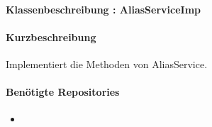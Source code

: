 \paragraph{Klassenbeschreibung : AliasServiceImp}%
\paragraph*{Kurzbeschreibung}
Implementiert die Methoden von AliasService.
\paragraph*{Benötigte Repositories}
\begin{itemize}
    \item 
\end{itemize}
